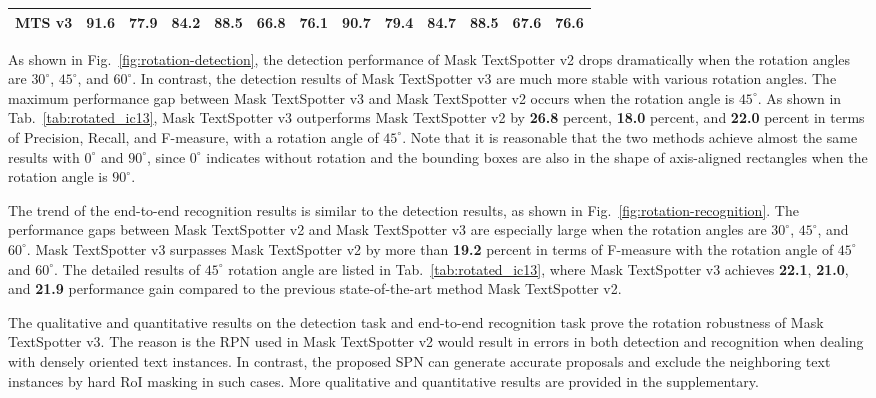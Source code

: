 \documentclass[runningheads]{llncs}
\newcommand{\minisection}[1]{\noindent{\textbf{#1}}}
\begin{document}
\begin{table*}[ht]
\begin{tabularx}{1.0\textwidth}{lc*{5}ccc*{4}c}
    \textbf{MTS v3}     & \textbf{91.6}    & \textbf{77.9}    & \textbf{84.2}    & \textbf{88.5}               & \textbf{66.8}               & \textbf{76.1}             & \textbf{90.7}    & \textbf{79.4}    & \textbf{84.7}    & \textbf{88.5}               & \textbf{67.6}               & \textbf{76.6}             \\ 
    \bottomrule
    \end{tabularx}
    \label{tab:rotated_ic13}
\end{table*}

\minisection{Detection task}
As shown in Fig.~\ref{fig:rotation-detection}, the detection performance of Mask TextSpotter v2 drops dramatically when the rotation angles are $30^\circ$, $45^\circ$, and $60^\circ$. In contrast, the detection results of Mask TextSpotter v3 are much more stable with various rotation angles. The maximum performance gap between Mask TextSpotter v3 and Mask TextSpotter v2 occurs when the rotation angle is $45^\circ$. As shown in Tab.~\ref{tab:rotated_ic13}, Mask TextSpotter v3 outperforms Mask TextSpotter v2 by \textbf{26.8} percent, \textbf{18.0} percent, and \textbf{22.0} percent in terms of Precision, Recall, and F-measure, with a rotation angle of $45^\circ$. Note that it is reasonable that the two methods achieve almost the same results with $0^\circ$ and $90^\circ$, since $0^\circ$ indicates without rotation and the bounding boxes are also in the shape of axis-aligned rectangles when the rotation angle is $90^\circ$.

\minisection{End-to-end recognition task}
The trend of the end-to-end recognition results is similar to the detection results, as shown in Fig.~\ref{fig:rotation-recognition}. The performance gaps between Mask TextSpotter v2 and Mask TextSpotter v3 are especially large when the rotation angles are $30^\circ$, $45^\circ$, and $60^\circ$. Mask TextSpotter v3 surpasses Mask TextSpotter v2 by more than \textbf{19.2} percent in terms of F-measure with the rotation angle of $45^\circ$ and $60^\circ$. The detailed results of $45^\circ$ rotation angle are listed in Tab.~\ref{tab:rotated_ic13}, where Mask TextSpotter v3 achieves \textbf{22.1}, \textbf{21.0}, and \textbf{21.9} performance gain compared to the previous state-of-the-art method Mask TextSpotter v2.

The qualitative and quantitative results on the detection task and end-to-end recognition task prove the rotation robustness of Mask TextSpotter v3. The reason is the RPN used in Mask TextSpotter v2 would result in errors in both detection and recognition when dealing with densely oriented text instances. In contrast, the proposed SPN can generate accurate proposals and exclude the neighboring text instances by hard RoI masking in such cases. More qualitative and quantitative results are provided in the supplementary.
\end{document}
